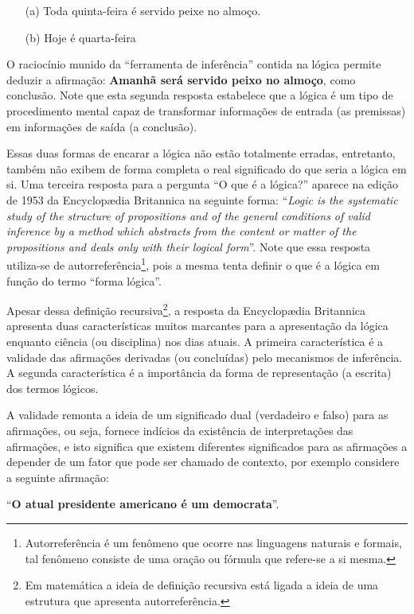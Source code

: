 \begin{itemize}
	\item[(a)] Toda quinta-feira é servido peixe no almoço.
	\item[(b)] Hoje é quarta-feira
\end{itemize}

O raciocínio munido da ``ferramenta de inferência'' contida na lógica permite deduzir a afirmação: \textbf{Amanhã será servido peixo no almoço}, como conclusão. Note que esta segunda resposta estabelece que a lógica é um tipo de procedimento mental capaz de transformar informações de entrada (as premissas) em informações de saída (a conclusão). 

Essas duas formas de encarar a lógica não estão totalmente erradas, entretanto, também não exibem de forma completa o real significado do que seria a lógica em si. Uma terceira resposta para a pergunta ``O que é a lógica?'' aparece na edição de 1953 da Encyclopædia Britannica na seguinte forma: ``\textit{Logic is the systematic study of the structure of propositions and of the general conditions of valid inference by a method which abstracts from the content or matter of the propositions and deals only with their logical form}''. Note que essa resposta utiliza-se de autorreferência\footnote{Autorreferência é um fenômeno que ocorre nas linguagens naturais e formais, tal fenômeno consiste de uma oração ou fórmula que refere-se a si mesma.}, pois a mesma tenta definir o que é a lógica em função do termo ``forma lógica''. 

Apesar dessa definição recursiva\footnote{Em matemática a ideia de definição recursiva está ligada a ideia de uma estrutura que apresenta autorreferência.}, a resposta da Encyclopædia Britannica apresenta duas características muitos marcantes para a apresentação da lógica enquanto ciência (ou disciplina) nos dias atuais. A primeira característica é a validade das afirmações derivadas (ou concluídas) pelo mecanismos de inferência. A segunda característica é a importância da forma de representação (a escrita) dos termos lógicos. 

A validade remonta a ideia de um significado dual (verdadeiro e falso) para as afirmações, ou seja, fornece indícios da existência de interpretações das afirmações, e isto significa que existem diferentes significados para as afirmações a depender de um fator que pode ser chamado de contexto, por exemplo considere a seguinte afirmação: 

\begin{center}
	``\textbf{O atual presidente americano é um democrata}''.
\end{center}

